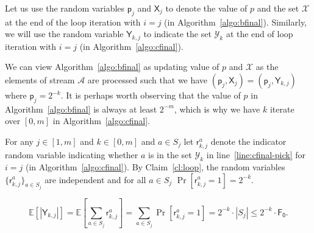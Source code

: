 \documentclass[a4paper,UKenglish,cleveref, autoref, thm-restate]{lipics-v2021}
\newcommand{\stream}{\mathcal{A}}
\newcommand{\Fo}{\ensuremath{\mathsf{F_0}}}
\newcommand{\p}{\mathsf{p}}
\begin{document}
Let us use the random variables $\p_j$ and $\mathsf{X}_{j}$ to denote the value of $p$ and the set $\mathcal{X}$ at the end of the loop iteration with $i=j$ (in Algorithm~\ref{algo:bfinal}). Similarly, we will use the random variable $\mathsf{Y}_{k,j}$ to indicate the set $\mathcal{Y}_{k}$ at the end of loop iteration with $i=j$ (in Algorithm~\ref{algo:cfinal}). 

We can view Algorithm~\ref{algo:bfinal} as updating value of $p$ and $\mathcal{X}$ as the elements of stream $\stream$ are processed such that we have $(\p_j,\mathsf{X}_{j}) = (\p_j,\mathsf{Y}_{k,j})$ where $\p_j=2^{-k}$. It is perhaps worth observing that the value of $p$ in Algorithm~\ref{algo:bfinal} is always at least $2^{-m}$, which is why we have $k$ iterate over $[0,m]$ in Algorithm~\ref{algo:cfinal}.   







For any $j \in [1, m]$ and $k\in [0,m]$ and $a\in S_j$ let $\mathsf{r}^a_{k,j}$ denote the indicator random variable indicating whether $a$ is in the set $\mathcal{Y}_{k}$ in line~\ref{line:cfinal-pick} for $i = j$ (in Algorithm~\ref{algo:cfinal}).  By Claim~\ref{cl:loop}, the random variables $\{\mathsf{r}^a_{k, j}\}_{a\in S_j}$ are independent and for all $a\in S_j$ $\Pr[\mathsf{r}^a_{k,j} = 1] = 2^{-k}$. 


\begin{equation}\label{eq:Yellj}\mathbb{E}\left[|\mathsf{Y}_{k,j}|\right] = \mathbb{E}\left[\sum_{a\in S_{j}}\mathsf{r}^a_{k,j}\right] = \sum_{a\in S_{j}}\Pr[\mathsf{r}^a_{k,j} = 1] = 2^{-k}\cdot |S_{j}| \leq  2^{-k} \cdot \Fo 

.\end{equation}
\end{document}
